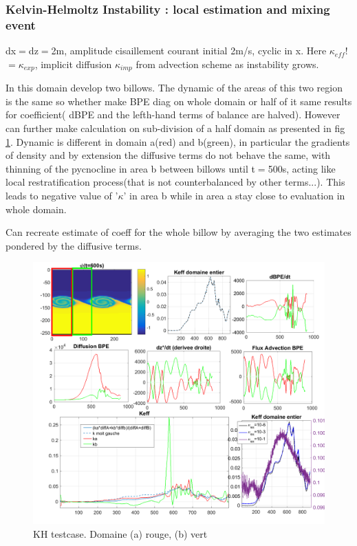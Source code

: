 \subsubsection{Kelvin-Helmoltz Instability : local estimation and mixing event}

dx$=$dz$=$2m, amplitude cisaillement courant initial 2m/s, cyclic in x. Here $\kappa_{eff}$!$= \kappa_{exp}$, implicit diffusion $\kappa_{imp}$ from advection scheme as instability grows.

In this domain develop two billows. The dynamic of the areas of this two region is the same so whether make BPE diag on whole domain or half of it same results for coefficient( dBPE and the lefth-hand terms of balance are halved).
However can further make calculation on sub-division of a half domain as presented in fig \ref{figCkh}. Dynamic is different in domain a(red) and b(green), in particular the gradients of density and by extension the diffusive terms do not behave the same, with thinning of the pycnocline in area b between billows until t$=$500s, acting like local restratification process(that is not counterbalanced by other terms...). This leads to negative value of '$\kappa$' in area b while in area a stay close to evaluation in whole domain.

Can recreate estimate of coeff for the whole billow by averaging the two estimates pondered by the diffusive terms. 


\begin{figure}[h!]
\centering
\includegraphics[width=1\textwidth]{./CHAP_BPE/AGBPE_numlab8-3c.png}
\caption{KH testcase. Domaine (a) rouge, (b) vert}
\label{figCkh}
\end{figure}


\newpage


%
%


